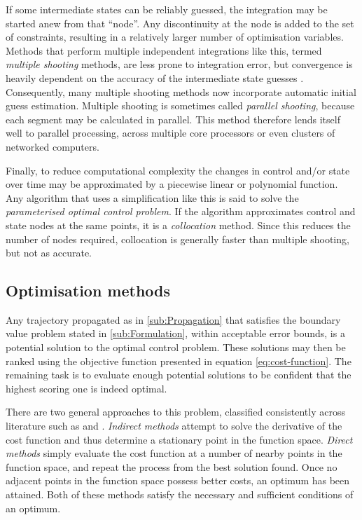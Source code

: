 If some intermediate states can be reliably guessed, the integration may be started anew from that \enquote{node}. Any discontinuity at the node is added to the set of constraints, resulting in a relatively larger number of optimisation variables. Methods that perform multiple independent integrations like this, termed \emph{multiple shooting} methods, are less prone to integration error, but convergence is heavily dependent on the accuracy of the intermediate state guesses \parencite{Betts1998, ASTOS_guide}. Consequently, many multiple shooting methods now incorporate automatic initial guess estimation. Multiple shooting is sometimes called \emph{parallel shooting}, because each segment may be calculated in parallel. This method therefore lends itself well to parallel processing, across multiple core processors or even clusters of networked computers. 

Finally, to reduce computational complexity the changes in control and/or state over time may be approximated by a piecewise linear or polynomial function. Any algorithm that uses a simplification like this is said to solve the \emph{parameterised optimal control problem}. If the algorithm approximates control and state nodes at the same points, it is a \emph{collocation} method. Since this reduces the number of nodes required, collocation is generally faster than multiple shooting, but not as accurate.%


\subsection{Optimisation methods} \label{sec:Process}

Any trajectory propagated as in \autoref{sub:Propagation} that satisfies the boundary value problem stated in \autoref{sub:Formulation}, within acceptable error bounds, is a potential solution to the optimal control problem. These solutions may then be ranked using the objective function presented in equation \eqref{eq:cost-function}. The remaining task is to evaluate enough potential solutions to be confident that the highest scoring one is indeed optimal. 

There are two general approaches to this problem, classified consistently across literature such as \textcite{Betts1998} and \textcite{ASTOS_guide}. \emph{Indirect methods} attempt to solve the derivative of the cost function and thus determine a stationary point in the function space. \emph{Direct methods} simply evaluate the cost function at a number of nearby points in the function space, and repeat the process from the best solution found. Once no adjacent points in the function space possess better costs, an optimum has been attained. Both of these methods satisfy the necessary and sufficient conditions of an optimum. 

